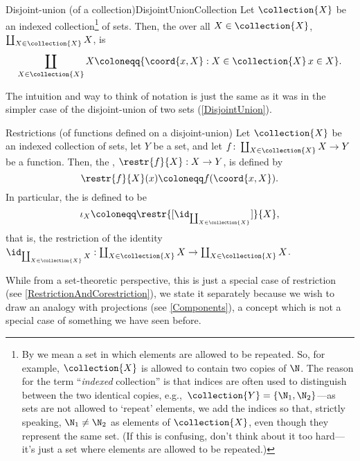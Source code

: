 \begin{dfn}{Disjoint-union (of a collection)}{DisjointUnionCollection}
Let $\collection{X}$ be an indexed collection\footnote{By  we mean a set in which elements are allowed to be repeated.  So, for example, $\collection{X}$ is allowed to contain two copies of $\N$.  The reason for the term ``\emph{indexed} collection'' is that indices are often used to distinguish between the two identical copies, e.g.,~$\collection{Y}=\{ \N _1,\N _2\}$---as sets are not allowed to `repeat' elements, we add the indices so that, strictly speaking, $\N _1\neq \N _2$ as elements of $\collection{X}$, even though they represent the same set.  (If this is confusing, don't think about it too hard---it's just a set where elements are allowed to be repeated.)} of sets.  Then, the  over all $X\in \collection{X}$, $\coprod _{X\in \collection{X}}X$, is
\begin{equation}
\coprod _{X\in \collection{X}}X\coloneqq \{ \coord{x,X}:X\in \collection{X}\, x\in X\} .
\end{equation}
\begin{rmk}
The intuition and way to think of notation is just the same as it was in the simpler case of the disjoint-union of two sets (\cref{DisjointUnion}).
\end{rmk}
\end{dfn}
\begin{dfn}{Restrictions (of functions defined on a dis\-joint-union)}{}
Let $\collection{X}$ be an indexed collection of sets, let $Y$ be a set, and let $f\colon \coprod _{X\in \collection{X}}X\rightarrow Y$ be a function.  Then, the , $\restr{f}{X}:X\rightarrow Y$, is defined by
\begin{equation}
\restr{f}{X}(x)\coloneqq f(\coord{x,X}).
\end{equation}
In particular, the  is defined to be
\begin{equation}
\iota _X\coloneqq \restr{[\id _{\coprod _{X\in \collection{X}}}]}{X},
\end{equation}
that is, the restriction of the identity $\id _{\coprod _{X\in \collection{X}}X}:\coprod _{X\in \collection{X}}X\rightarrow \coprod _{X\in \collection{X}}X$.
\begin{rmk}
While from a set-theoretic perspective, this is just a special case of restriction (see \cref{RestrictionAndCorestriction}), we state it separately because we wish to draw an analogy with projections (see \cref{Components}), a concept which is not a special case of something we have seen before. 
\end{rmk}
\end{dfn}

